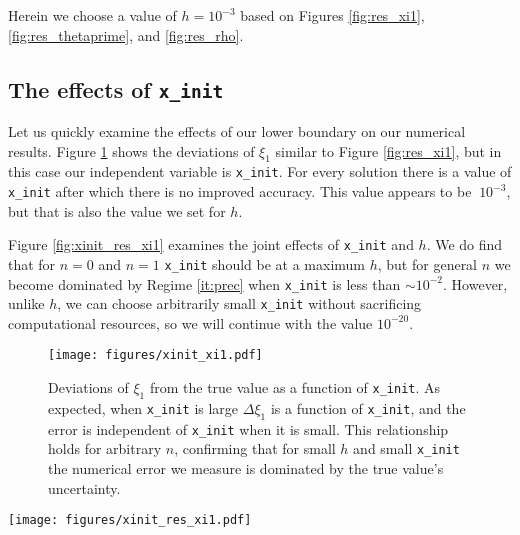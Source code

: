 \documentclass[twocolumn]{aastex631}
\begin{document}
Herein we choose a value of $h = 10^{-3}$ based on Figures \ref{fig:res_xi1},
\ref{fig:res_thetaprime}, and \ref{fig:res_rho}.

\subsection{The effects of \texttt{x\_init}}
\label{subsec:init}
Let us quickly examine the effects of our lower boundary on our
numerical results. Figure \ref{fig:xinit_xi1} shows the
deviations of $\xi_1$ similar to Figure \ref{fig:res_xi1},
but in this case our independent variable is \texttt{x\_init}.
For every solution there is a value of \texttt{x\_init}
after which there is no improved accuracy. This value appears to be
$~10^{-3}$, but that is also the value we set for $h$.

Figure \ref{fig:xinit_res_xi1} examines the joint effects of 
\texttt{x\_init} and $h$. We do find that for $n=0$ and $n=1$
\texttt{x\_init} should be at a maximum $h$, but for general $n$
we become dominated by Regime \ref{it:prec} when \texttt{x\_init}
is less than $\sim 10^{-2}$. However, unlike $h$, we can choose arbitrarily
small \texttt{x\_init} without sacrificing computational
resources, so we will continue with the value $10^{-20}$.

\begin{figure}[h]
    \begin{centering}
        \texttt{[image: figures/xinit\_xi1.pdf]}
        \caption{Deviations of $\xi_1$ from the true value as a
        function of \texttt{x\_init}. As expected, when \texttt{x\_init}
        is large $\Delta \xi_1$ is a function of \texttt{x\_init},
        and the error is independent of \texttt{x\_init} when it is small.
        This relationship holds for arbitrary $n$, confirming that
        for small $h$ and small \texttt{x\_init} the numerical
        error we measure is dominated by the true value's uncertainty.}
        \label{fig:xinit_xi1}
    \end{centering}
\end{figure}

\begin{figure*}[h]
    \begin{centering}
        \texttt{[image: figures/xinit\_res\_xi1.pdf]}
        \caption{Deviations of $\xi_1$ from the true value as a function
        of both \texttt{x\_init} and $h$. The dashed line
        marks the curve \texttt{x\_init}$=h$.}
        \label{fig:xinit_res_xi1}
    \end{centering}
\end{figure*}






\end{document}
